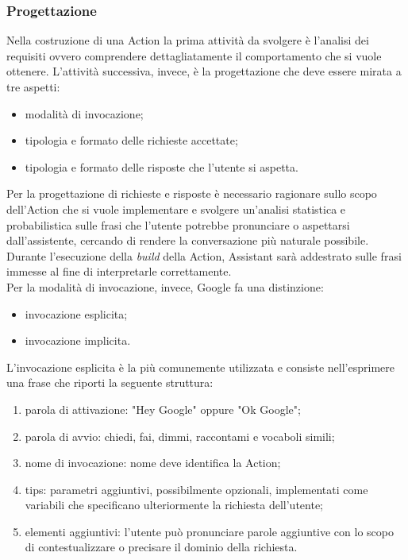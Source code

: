 		\subsubsection{Progettazione}
		Nella costruzione di una Action la prima attività da svolgere è l'analisi dei requisiti ovvero comprendere dettagliatamente il comportamento che si vuole ottenere. L'attività successiva, invece, è la progettazione che deve essere mirata a tre aspetti:
		\begin{itemize}
			\item modalità di invocazione;
			\item tipologia e formato delle richieste accettate;
			\item tipologia e formato delle risposte che l'utente si aspetta.
		\end{itemize}
		Per la progettazione di richieste e risposte è necessario ragionare sullo scopo dell'Action che si vuole implementare e svolgere un'analisi statistica e probabilistica sulle frasi che l'utente potrebbe pronunciare o aspettarsi dall'assistente, cercando di rendere la conversazione più naturale possibile. Durante l'esecuzione della \textit{build} della Action, Assistant sarà addestrato sulle frasi immesse al fine di interpretarle correttamente. \\
		Per la modalità di invocazione, invece, Google fa una distinzione:
		\begin{itemize}
			\item invocazione esplicita;
			\item invocazione implicita.
		\end{itemize}
		L'invocazione esplicita è la più comunemente utilizzata e consiste nell'esprimere una frase che riporti la seguente struttura:
		\begin{enumerate}
			\item parola di attivazione: "Hey Google" oppure "Ok Google";
			\item parola di avvio: chiedi, fai, dimmi, raccontami e vocaboli simili;
			\item nome di invocazione: nome deve identifica la Action;
			\item tips: parametri aggiuntivi, possibilmente opzionali, implementati come variabili che specificano ulteriormente la richiesta dell'utente;
			\item elementi aggiuntivi: l'utente può pronunciare parole aggiuntive con lo scopo di contestualizzare o precisare il dominio della richiesta.
		\end{enumerate}

